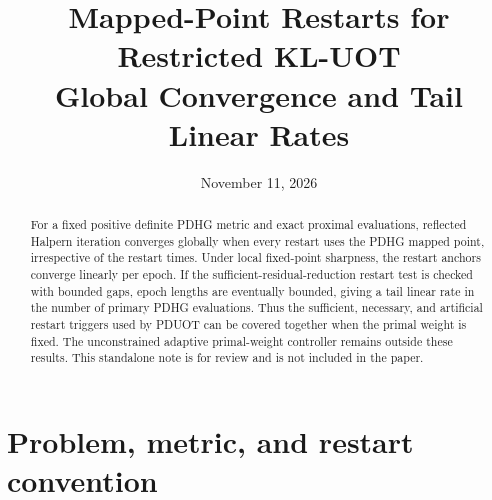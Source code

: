 \documentclass[11pt]{article}
\title{Mapped-Point Restarts for Restricted KL-UOT\\\large Global Convergence and Tail Linear Rates}
\author{}
\date{November 11, 2026}
\theoremstyle{remark}
\begin{document}
\maketitle

\begin{abstract}
For a fixed positive definite PDHG metric and exact proximal evaluations, reflected Halpern iteration converges globally when every restart uses the PDHG mapped point, irrespective of the restart times.
Under local fixed-point sharpness, the restart anchors converge linearly per epoch.
If the sufficient-residual-reduction restart test is checked with bounded gaps, epoch lengths are eventually bounded, giving a tail linear rate in the number of primary PDHG evaluations.
Thus the sufficient, necessary, and artificial restart triggers used by PDUOT can be covered together when the primal weight is fixed.
The unconstrained adaptive primal-weight controller remains outside these results.
This standalone note is for review and is not included in the paper.
\end{abstract}

\section{Problem, metric, and restart convention}
\end{document}
